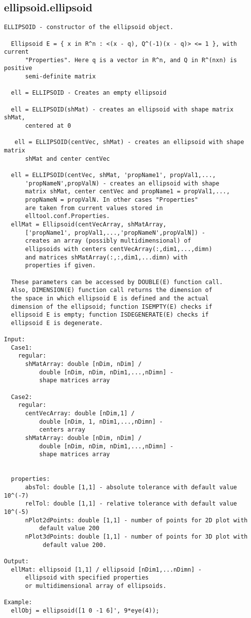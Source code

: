 \subsection{\texorpdfstring{ellipsoid.ellipsoid}{ellipsoid}}\label{method:ellipsoid.ellipsoid}
\begin{verbatim}
ELLIPSOID - constructor of the ellipsoid object.

  Ellipsoid E = { x in R^n : <(x - q), Q^(-1)(x - q)> <= 1 }, with current
      "Properties". Here q is a vector in R^n, and Q in R^(nxn) is positive
      semi-definite matrix

  ell = ELLIPSOID - Creates an empty ellipsoid

  ell = ELLIPSOID(shMat) - creates an ellipsoid with shape matrix shMat,
      centered at 0

   ell = ELLIPSOID(centVec, shMat) - creates an ellipsoid with shape matrix
      shMat and center centVec

  ell = ELLIPSOID(centVec, shMat, 'propName1', propVal1,...,
      'propNameN',propValN) - creates an ellipsoid with shape
      matrix shMat, center centVec and propName1 = propVal1,...,
      propNameN = propValN. In other cases "Properties"
      are taken from current values stored in
      elltool.conf.Properties.
  ellMat = Ellipsoid(centVecArray, shMatArray,
      ['propName1', propVal1,...,'propNameN',propValN]) -
      creates an array (possibly multidimensional) of
      ellipsoids with centers centVecArray(:,dim1,...,dimn)
      and matrices shMatArray(:,:,dim1,...dimn) with
      properties if given.

  These parameters can be accessed by DOUBLE(E) function call.
  Also, DIMENSION(E) function call returns the dimension of
  the space in which ellipsoid E is defined and the actual
  dimension of the ellipsoid; function ISEMPTY(E) checks if
  ellipsoid E is empty; function ISDEGENERATE(E) checks if
  ellipsoid E is degenerate.

Input:
  Case1:
    regular:
      shMatArray: double [nDim, nDim] /
          double [nDim, nDim, nDim1,...,nDimn] -
          shape matrices array

  Case2:
    regular:
      centVecArray: double [nDim,1] /
          double [nDim, 1, nDim1,...,nDimn] -
          centers array
      shMatArray: double [nDim, nDim] /
          double [nDim, nDim, nDim1,...,nDimn] -
          shape matrices array


  properties:
      absTol: double [1,1] - absolute tolerance with default value 10^(-7)
      relTol: double [1,1] - relative tolerance with default value 10^(-5)
      nPlot2dPoints: double [1,1] - number of points for 2D plot with
          default value 200
      nPlot3dPoints: double [1,1] - number of points for 3D plot with
           default value 200.

Output:
  ellMat: ellipsoid [1,1] / ellipsoid [nDim1,...nDimn] -
      ellipsoid with specified properties
      or multidimensional array of ellipsoids.

Example:
  ellObj = ellipsoid([1 0 -1 6]', 9*eye(4));
\end{verbatim}
